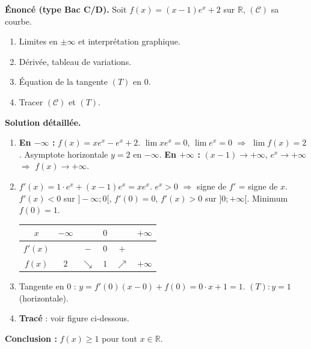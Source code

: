 \documentclass[11pt]{article}
\begin{document}
\begin{exoresolu}[Étude complète de $f(x)=(x-1)e^{x}+2$]
\textbf{Énoncé (type Bac C/D).} Soit $f(x)=(x-1)e^{x}+2$ sur $\mathbb{R}$, $(\mathcal{C})$ sa courbe.
\begin{enumerate}
\item Limites en $\pm\infty$ et interprétation graphique.
\item Dérivée, tableau de variations.
\item Équation de la tangente $(T)$ en $0$.
\item Tracer $(\mathcal{C})$ et $(T)$.
\end{enumerate}
\tcblower
\textbf{Solution détaillée.}
\begin{enumerate}
\item \textbf{En $-\infty$ :} $f(x)=xe^{x}-e^{x}+2$. $\lim xe^{x}=0$, $\lim e^{x}=0$ $\Rightarrow$ $\lim f(x)=2$.
Asymptote horizontale $y=2$ en $-\infty$.
\textbf{En $+\infty$ :} $(x-1)\to+\infty$, $e^{x}\to+\infty$ $\Rightarrow$ $f(x)\to+\infty$.

\item $f'(x)=1\cdot e^{x}+(x-1)e^{x}=xe^{x}$.
$e^{x}>0$ $\Rightarrow$ signe de $f'$ = signe de $x$.
$f'(x)<0$ sur $]-\infty;0[$, $f'(0)=0$, $f'(x)>0$ sur $]0;+\infty[$.
Minimum $f(0)=1$.

\begin{center}
\begin{tabular}{|c|ccccc|}
\hline
$x$ & $-\infty$ & & $0$ & & $+\infty$ \\
\hline
$f'(x)$ & & $-$ & $0$ & $+$ & \\
\hline
$f(x)$ & $2$ & $\searrow$ & $1$ & $\nearrow$ & $+\infty$ \\
\hline
\end{tabular}
\end{center}

\item Tangente en $0$ : $y=f'(0)(x-0)+f(0)=0\cdot x+1=1$. $(T): y=1$ (horizontale).

\item \textbf{Tracé} : voir figure ci-dessous.
\end{enumerate}
\textbf{Conclusion :} $f(x)\geq 1$ pour tout $x\in\mathbb{R}$.
\end{exoresolu}
\end{document}

